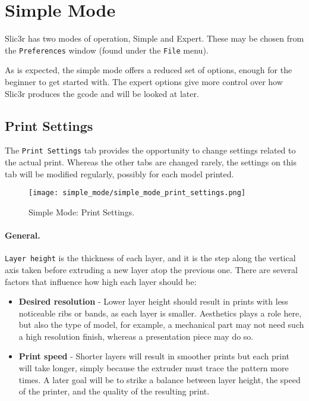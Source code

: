 
\section{Simple Mode}
Slic3r has two modes of operation, Simple and Expert. These may be chosen from the \texttt{Preferences} window (found under the \texttt{File} menu).  

\setlength\fboxsep{10pt}
\setlength\fboxrule{0pt}
\noindent
\centerline{}

As is expected, the simple mode offers a reduced set of options, enough for the beginner to get started with.  The expert options give more control over how Slic3r produces the gcode and will be looked at later.

\subsection{Print Settings}

The \texttt{Print Settings} tab provides the opportunity to change settings related to the actual print.  Whereas the other tabs are changed rarely, the settings on this tab will be modified regularly, possibly for each model printed.

\begin{figure}[ht]
\centering
\texttt{[image: simple\_mode/simple\_mode\_print\_settings.png]}
\caption{Simple Mode: Print Settings.}
\label{fig:simple_mode_print_settings}
\end{figure}

\paragraph{General.} %
\label{par:simple_general}

\texttt{Layer height} is the thickness of each layer, and it is the step along the vertical axis taken before extruding a new layer atop the previous one.  There are several factors that influence how high each layer should be:
\begin{itemize}
	\item \textbf{Desired resolution}  - Lower layer height should result in prints with less noticeable ribs or bands, as each layer is smaller.  Aesthetics plays a role here, but also the type of model, for example, a mechanical part may not need such a high resolution finish, whereas a presentation piece may do so.
	\item \textbf{Print speed}  - Shorter layers will result in smoother prints but each print will take longer, simply because the extruder must trace the pattern more times.  A later goal will be to strike a balance between layer height, the speed of the printer, and the quality of the resulting print.
\end{itemize} 

